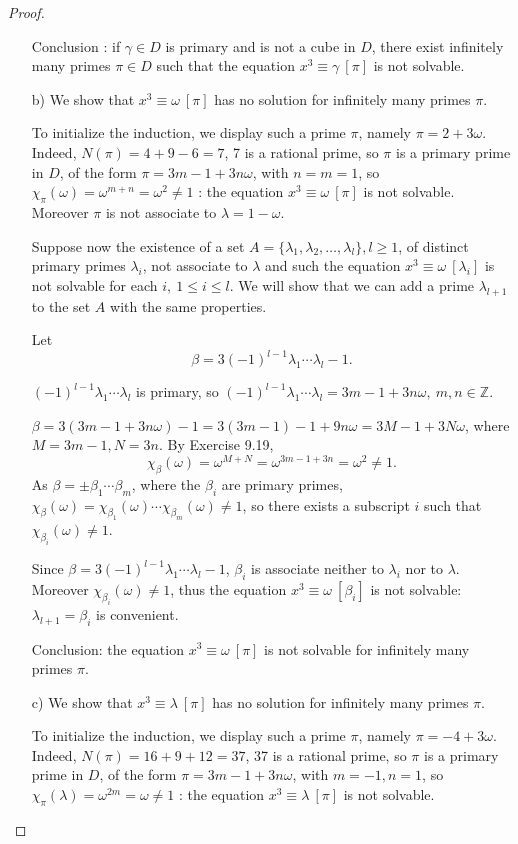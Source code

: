 \documentclass[11pt,a4paper]{article}
\newcommand{\Z}{\mathbb{Z}}
\begin{document}
\begin{proof}
\begin{enumerate}
Conclusion : if $\gamma \in D$ is primary and is not a cube in $D$, there exist infinitely many primes $\pi \in D$ such that the equation $x^3 \equiv \gamma \ [\pi]$ is not solvable.
\item[b)] We show that $x^3 \equiv \omega \ [\pi]$ has no solution for infinitely many primes $\pi$.

To initialize the induction, we display such a prime $\pi$, namely $\pi = 2+ 3 \omega$. Indeed, $N(\pi) = 4 + 9 - 6 = 7$, 7 is a rational prime, so $\pi$ is a primary prime in $D$, of the form $\pi = 3m-1 + 3n\omega$, with $n = m =1$, so $\chi_\pi(\omega) = \omega^{m+n} = \omega^2 \neq 1$ : the equation $x^3 \equiv \omega \ [\pi]$ is not solvable. Moreover $\pi$ is not associate to $\lambda = 1 - \omega$.

Suppose now the existence of a set $A = \{\lambda_1,\lambda_2,\ldots,\lambda_l\}, l \geq 1$, of distinct primary primes $\lambda_i$, not associate to $\lambda$ and such the equation $x^3 \equiv \omega\ [\lambda_i]$ is not solvable for each $i, \ 1\leq i \leq l$. We will show that we can add a prime $\lambda_{l+1}$  to the set $A$ with the same properties.


Let $$\beta = 3(-1)^{l-1} \lambda_1\cdots\lambda_l - 1.$$

$(-1)^{l-1} \lambda_1\cdots\lambda_l$ is primary, so $(-1)^{l-1} \lambda_1\cdots\lambda_l = 3m-1 + 3n\omega,\ m,n \in \Z$.

$\beta = 3(3m-1 + 3n\omega) - 1 = 3(3m-1) - 1 + 9n\omega = 3M-1 + 3 N \omega$, where $M = 3m-1, N = 3n$. By Exercise 9.19,
$$\chi_\beta(\omega) = \omega^{M+N} = \omega^{3m-1+3n} = \omega^2 \neq 1.$$
As $\beta = \pm \beta_1\cdots\beta_m$, where the $\beta_i$ are primary primes, $\chi_\beta(\omega) = \chi_{\beta_1}(\omega) \cdots \chi_{\beta_m}(\omega) \neq 1$, so there exists a subscript $i$ such that $\chi_{\beta_i}(\omega) \ne 1$. 

Since $\beta = 3(-1)^{l-1} \lambda_1\cdots\lambda_l - 1$, $\beta_i$ is associate neither to $\lambda_i$ nor to $\lambda$. Moreover $\chi_{\beta_i}(\omega)\ne 1$, thus the equation $x^3 \equiv \omega\ [\beta_i]$ is not solvable: $\lambda_{l+1} = \beta_i$ is convenient.

Conclusion: the equation $x^3 \equiv \omega \ [\pi]$ is not solvable for infinitely many primes $\pi$.

\item[c)] We show that $x^3 \equiv \lambda \ [\pi]$ has no solution for infinitely many primes $\pi$.

To initialize the induction, we display such a prime $\pi$, namely $\pi = -4 + 3 \omega$. Indeed, $N(\pi) = 16 + 9 + 12 = 37$, 37 is a rational prime, so $\pi$ is a primary prime in $D$, of the form $\pi = 3m-1 + 3n\omega$, with $m=-1,n=1$, so $\chi_\pi(\lambda) = \omega^{2m} = \omega \neq 1$ : the equation $x^3 \equiv \lambda \ [\pi]$ is not solvable.


\end{enumerate}
\end{proof}
\end{document}
